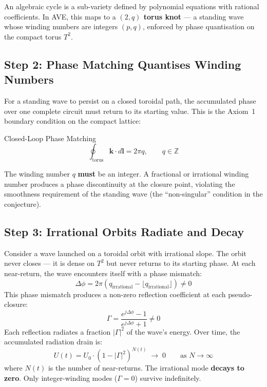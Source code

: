 An algebraic cycle is a sub-variety defined by polynomial equations with rational coefficients. In AVE, this maps to a \textbf{$(2,q)$ torus knot} --- a standing wave whose winding numbers are integers $(p, q)$, enforced by phase quantisation on the compact torus $T^2$.

\subsection{Step 2: Phase Matching Quantises Winding Numbers}

For a standing wave to persist on a closed toroidal path, the accumulated phase over one complete circuit must return to its starting value. This is the Axiom~1 boundary condition on the compact lattice:
\begin{resultbox}{Closed-Loop Phase Matching}
\begin{equation}
    \oint_{\text{torus}} \mathbf{k} \cdot d\mathbf{l} = 2\pi q, \qquad q \in \mathbb{Z}
\end{equation}
\end{resultbox}
The winding number $q$ \textbf{must} be an integer. A fractional or irrational winding number produces a phase discontinuity at the closure point, violating the smoothness requirement of the standing wave (the ``non-singular'' condition in the conjecture).

\subsection{Step 3: Irrational Orbits Radiate and Decay}

Consider a wave launched on a toroidal orbit with irrational slope. The orbit never closes --- it is dense on $T^2$ but never returns to its starting phase. At each near-return, the wave encounters itself with a phase mismatch:
\begin{equation}
    \Delta\phi = 2\pi(q_\mathrm{irrational} - \lfloor q_\mathrm{irrational} \rfloor) \neq 0
\end{equation}
This phase mismatch produces a non-zero reflection coefficient at each pseudo-closure:
\begin{equation}
    \Gamma = \frac{e^{j\Delta\phi} - 1}{e^{j\Delta\phi} + 1} \neq 0
\end{equation}
Each reflection radiates a fraction $|\Gamma|^2$ of the wave's energy. Over time, the accumulated radiation drain is:
\begin{equation}
    U(t) = U_0 \cdot (1 - |\Gamma|^2)^{N(t)} \;\to\; 0 \qquad \text{as } N \to \infty
\end{equation}
where $N(t)$ is the number of near-returns. The irrational mode \textbf{decays to zero}. Only integer-winding modes ($\Gamma = 0$) survive indefinitely.

